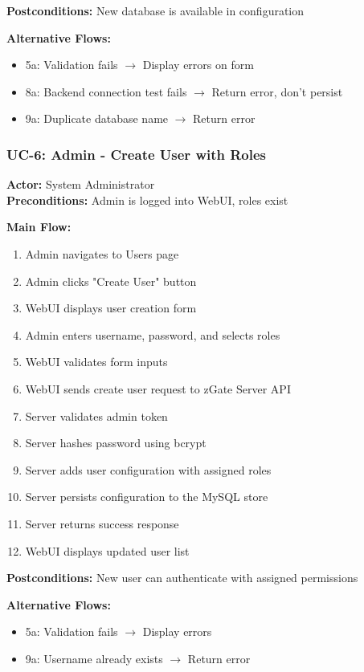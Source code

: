 \textbf{Postconditions:} New database is available in configuration

\textbf{Alternative Flows:}
\begin{itemize}
    \item 5a: Validation fails $\rightarrow$ Display errors on form
    \item 8a: Backend connection test fails $\rightarrow$ Return error, don't persist
    \item 9a: Duplicate database name $\rightarrow$ Return error
\end{itemize}

\subsubsection{UC-6: Admin - Create User with Roles}
\textbf{Actor:} System Administrator \\
\textbf{Preconditions:} Admin is logged into WebUI, roles exist

\textbf{Main Flow:}
\begin{enumerate}
    \item Admin navigates to Users page
    \item Admin clicks "Create User" button
    \item WebUI displays user creation form
    \item Admin enters username, password, and selects roles
    \item WebUI validates form inputs
    \item WebUI sends create user request to zGate Server API
    \item Server validates admin token
    \item Server hashes password using bcrypt
    \item Server adds user configuration with assigned roles
    \item Server persists configuration to the MySQL store
    \item Server returns success response
    \item WebUI displays updated user list
\end{enumerate}

\textbf{Postconditions:} New user can authenticate with assigned permissions

\textbf{Alternative Flows:}
\begin{itemize}
    \item 5a: Validation fails $\rightarrow$ Display errors
    \item 9a: Username already exists $\rightarrow$ Return error
\end{itemize}

